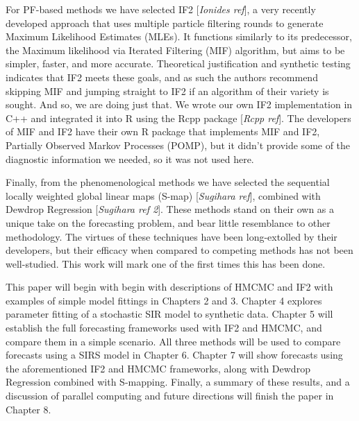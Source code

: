 For PF-based methods we have selected IF2 [\textit{Ionides ref}], a very recently developed approach that uses multiple particle filtering rounds to generate Maximum Likelihood Estimates (MLEs). It functions similarly to its predecessor, the Maximum likelihood via Iterated Filtering (MIF) algorithm, but aims to be simpler, faster, and more accurate. Theoretical justification and synthetic testing indicates that IF2 meets these goals, and as such the authors recommend skipping MIF and jumping straight to IF2 if an algorithm of their variety is sought. And so, we are doing just that. We wrote our own IF2 implementation in C++ and integrated it into R using the Rcpp package [\textit{Rcpp ref}]. The developers of MIF and IF2 have their own R package that implements MIF and IF2, Partially Observed Markov Processes (POMP), but it didn't provide some of the diagnostic information we needed, so it was not used here.

Finally, from the phenomenological methods we have selected the sequential locally weighted global linear maps (S-map) [\textit{Sugihara ref}], combined with Dewdrop Regression [\textit{Sugihara ref 2}]. These methods stand on their own as a unique take on the forecasting problem, and bear little resemblance to other methodology. The virtues of these techniques have been long-extolled by their developers, but their efficacy when compared to competing methods has not been well-studied. This work will mark one of the first times this has been done.

This paper will begin with begin with descriptions of HMCMC and IF2 with examples of simple model fittings in Chapters 2 and 3. Chapter 4 explores parameter fitting of a stochastic SIR model to synthetic data. Chapter 5 will establish the full forecasting frameworks used with IF2 and HMCMC, and compare them in a simple scenario. All three methods will be used to compare forecasts using a SIRS model in Chapter 6. Chapter 7 will show forecasts using the aforementioned IF2 and HMCMC frameworks, along with Dewdrop Regression combined with S-mapping. Finally, a summary of these results, and a discussion of parallel computing and future directions will finish the paper in Chapter 8.